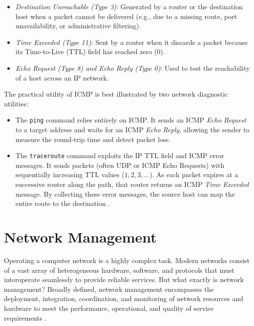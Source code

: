 \begin{itemize}
    \item \emph{Destination Unreachable (Type 3)}: Generated by a router or the destination host when a packet cannot be delivered (e.g., due to a missing route, port unavailability, or administrative filtering).
    \item \emph{Time Exceeded (Type 11)}: Sent by a router when it discards a packet because its Time-to-Live (TTL) field has reached zero (\(0\)).
    \item \emph{Echo Request (Type 8) and Echo Reply (Type 0)}: Used to test the reachability of a host across an IP network.
\end{itemize}

The practical utility of ICMP is best illustrated by two network diagnostic utilities:
\begin{itemize}
    \item The \texttt{ping} command relies entirely on ICMP. It sends an ICMP \emph{Echo Request} to a target address and waits for an ICMP \emph{Echo Reply}, allowing the sender to measure the round-trip time and detect packet loss.
    \item The \texttt{traceroute} command exploits the IP TTL field and ICMP error messages. It sends packets (often UDP or ICMP Echo Requests) with sequentially increasing TTL values (\(1, 2, 3, \dots\)). As each packet expires at a successive router along the path, that router returns an ICMP \emph{Time Exceeded} message. By collecting these error messages, the source host can map the entire route to the destination \cite{kurose2017}.
\end{itemize}

\section{Network Management}
Operating a computer network is a highly complex task.
Modern networks consist of a vast array of heterogeneous hardware, software, and protocols that must interoperate seamlessly to provide reliable services.
But what exactly is network management? Broadly defined, network management encompasses the deployment, integration, coordination, and monitoring of network resources and hardware to meet the performance, operational, and quality of service requirements \cite{kurose2017}.

